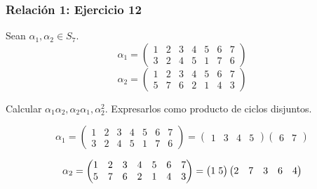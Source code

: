 \documentclass[11pt,a4paper]{article}
\begin{document}
\subsubsection*{Relación 1: Ejercicio 12}

Sean $\alpha_{1}, \alpha_{2} \in S_{7}$.
\begin{equation*}
\alpha_{1} = 
\begin{pmatrix}
1 & 2 & 3 & 4 & 5 & 6 & 7 \\
3 & 2 & 4 & 5 & 1 & 7 & 6
\end{pmatrix}
\end{equation*}
\begin{equation*}
\alpha_{2} = 
\begin{pmatrix}
1 & 2 & 3 & 4 & 5 & 6 & 7 \\
5 & 7 & 6 & 2 & 1 & 4 & 3
\end{pmatrix}
\end{equation*}

Calcular $\alpha_{1}\alpha_{2}, \alpha_{2}\alpha_{1}, \alpha_{2}^{2}$. Expresarlos como producto de ciclos disjuntos.

\begin{equation*}
\alpha_{1} = 
\begin{pmatrix}
1 & 2 & 3 & 4 & 5 & 6 & 7 \\
3 & 2 & 4 & 5 & 1 & 7 & 6
\end{pmatrix}
=
\begin{pmatrix}
1& 3 & 4 & 5
\end{pmatrix}
\begin{pmatrix}
6 & 7
\end{pmatrix}
\end{equation*}

\begin{equation*}
\alpha_{2} = 
\begin{pmatrix}
1 & 2 & 3 & 4 & 5 & 6 & 7 \\
5 & 7 & 6 & 2 & 1 & 4 & 3
\end{pmatrix}
=
\begin{pmatrix}
1 \hspace{0.1cm} 5
\end{pmatrix}
\begin{pmatrix}
2 & 7 & 3 & 6 & 4
\end{pmatrix}
\end{equation*}
\end{document}
